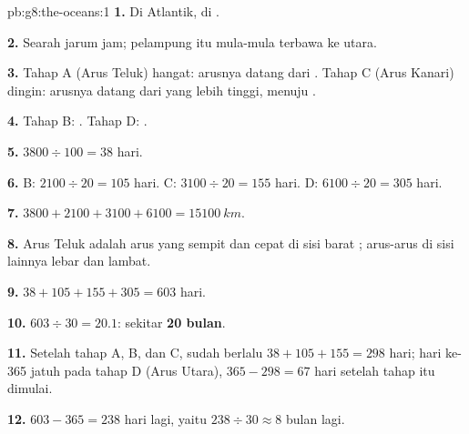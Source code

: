 \begin{solution}{pb:g8:the-oceans:1}
\textbf{1.} Di  Atlantik, di .

\textbf{2.} Searah jarum jam; pelampung itu mula-mula terbawa ke utara.

\textbf{3.} Tahap A (Arus Teluk) hangat: arusnya datang dari . Tahap C (Arus Kanari) dingin: arusnya datang dari  yang
lebih tinggi, menuju .

\textbf{4.} Tahap B: . Tahap D: .

\textbf{5.} $3800 \div 100 = 38$ hari.

\textbf{6.} B: $2100 \div 20 = 105$ hari. C: $3100 \div 20 = 155$ hari.
D: $6100 \div 20 = 305$ hari.

\textbf{7.} $3800 + 2100 + 3100 + 6100 = \qty{15100}{km}$.

\textbf{8.} Arus Teluk adalah arus yang sempit dan cepat di sisi barat
; arus-arus di sisi lainnya lebar dan lambat.

\textbf{9.} $38 + 105 + 155 + 305 = 603$ hari.

\textbf{10.} $603 \div 30 = 20.1$: sekitar \textbf{20 bulan}.

\textbf{11.} Setelah tahap A, B, dan C, sudah berlalu
$38 + 105 + 155 = 298$ hari; hari ke-365 jatuh pada tahap D (Arus
 Utara), $365 -
298 = 67$ hari setelah tahap itu dimulai.

\textbf{12.} $603 - 365 = 238$ hari lagi, yaitu $238 \div 30 \approx 8$
bulan lagi.
\end{solution}
